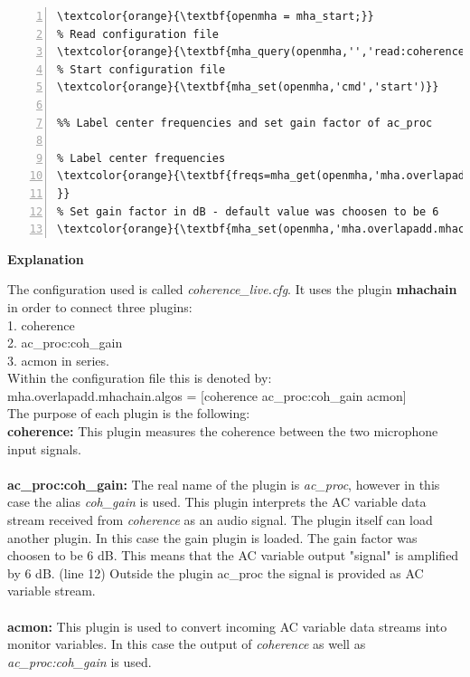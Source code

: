 \documentclass[11pt,a4paper,twoside]{article}
\newcommand{\+}{\discretionary{\mbox{\scriptsize$\hookleftarrow$}}{}{}}
\begin{document}
{{\begin{enumerate}
\begin{Verbatim}[numbers=left,commandchars=\\\{\}]
%Start openMHA process
\textcolor{orange}{\textbf{openmha = mha_start;}}
% Read configuration file
\textcolor{orange}{\textbf{mha_query(openmha,'','read:coherence_live.cfg');}}
% Start configuration file
\textcolor{orange}{\textbf{mha_set(openmha,'cmd','start')}}

%% Label center frequencies and set gain factor of ac_proc

% Label center frequencies
\textcolor{orange}{\textbf{freqs=mha_get(openmha,'mha.overlapadd.mhachain.coherence.cf'); 
}} 
% Set gain factor in dB - default value was choosen to be 6
\textcolor{orange}{\textbf{mha_set(openmha,'mha.overlapadd.mhachain.coh_gain.gain.gains',6);}}
\end{Verbatim} 



\newpage

\textbf{Explanation}

The configuration used is called \textit{coherence\_live.cfg}. It uses the plugin \textbf{mhachain} in order to connect three plugins: \\
1. coherence \\
2. ac\_proc:coh\_gain \\
3. acmon in series. \\
Within the configuration file this is denoted by: \\

{\ttfamily mha.overlapadd.mhachain.algos = [coherence ac\_proc:coh\_gain acmon]} \\



 The purpose of each plugin is the following: \\

\textbf{coherence:} This plugin measures the coherence between the two microphone input signals. \\ \\
\textbf{ac\_proc:coh\_gain:} The real name of the plugin is \textit{ac\_proc}, however in this case the alias \textit{coh\_gain} is used. This plugin interprets the AC variable data stream received from \textit{coherence} as an audio signal. The plugin itself can load another plugin. In this case the gain plugin is loaded. The gain factor was choosen to be 6 dB. This means that the AC variable output "signal" is amplified by 6 dB. (line 12) Outside the plugin ac\_proc the signal is provided as AC variable stream.\\ \\
\textbf{acmon:} This plugin is used to convert incoming AC variable data streams into monitor variables. In this case the output of \textit{coherence} as well as \textit{ac\_proc:coh\_gain} is used.


\end{enumerate}}}
\end{document}
